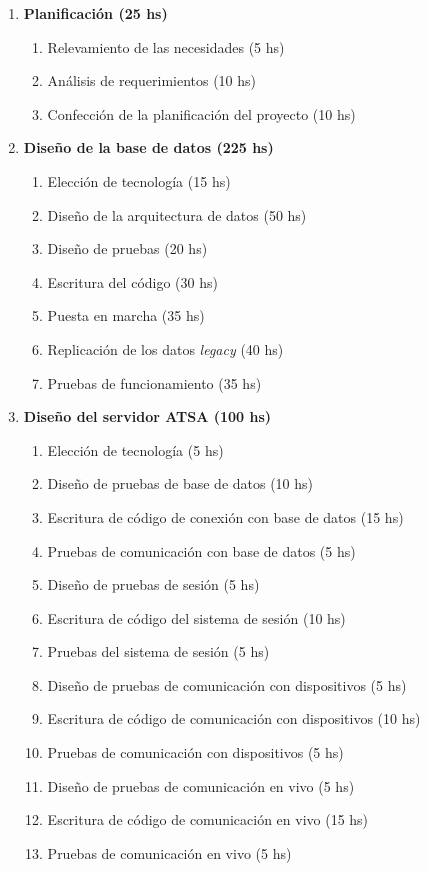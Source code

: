 \documentclass[
12pt,
spanish,
singlespacing,
parskip,
headsepline,]{article}
\begin{document}
\begin{enumerate}
	\item \textbf{Planificación (25 hs)}
	\begin{enumerate}
		\item Relevamiento de las necesidades (5 hs)
		\item Análisis de requerimientos (10 hs)
		\item Confección de la planificación del proyecto (10 hs)
	\end{enumerate}
	\item \textbf{Diseño de la base de datos (225 hs)}
	\begin{enumerate}
		\item Elección de tecnología (15 hs)
		\item Diseño de la arquitectura de datos (50 hs)
		\item Diseño de pruebas (20 hs)
		\item Escritura del código (30 hs)
		\item Puesta en marcha (35 hs)
		\item Replicación de los datos \emph{legacy} (40 hs)
		\item Pruebas de funcionamiento (35 hs)
	\end{enumerate}
	\item \textbf{Diseño del servidor ATSA (100 hs)}
	\begin{enumerate}
		\item Elección de tecnología (5 hs)
		\item Diseño de pruebas de base de datos (10 hs)
		\item Escritura de código de conexión con base de datos (15 hs)
		\item Pruebas de comunicación con base de datos (5 hs)
		\item Diseño de pruebas de sesión (5 hs)
		\item Escritura de código del sistema de sesión (10 hs)
		\item Pruebas del sistema de sesión (5 hs)
		\item Diseño de pruebas de comunicación con dispositivos (5 hs)
		\item Escritura de código de comunicación con dispositivos (10 hs)
		\item Pruebas de comunicación con dispositivos (5 hs)
		\item Diseño de pruebas de comunicación en vivo (5 hs)
		\item Escritura de código de comunicación en vivo (15 hs)
		\item Pruebas de comunicación en vivo (5 hs)

\end{enumerate}
\end{enumerate}
\end{document}
